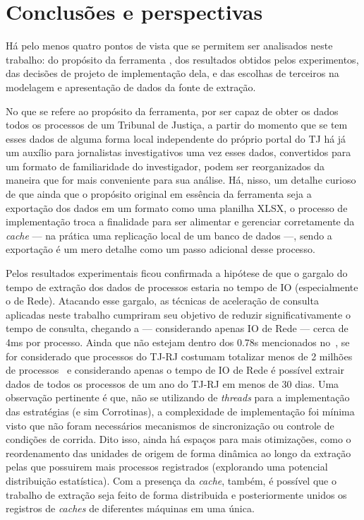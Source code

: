 \chapter{Conclusões e perspectivas~\label{chp:conclusions}}

Há pelo menos quatro pontos de vista que se permitem ser analisados neste
trabalho: do propósito da ferramenta \tjscraper, dos resultados obtidos pelos
experimentos, das decisões de projeto de implementação dela, e das escolhas de
terceiros na modelagem e apresentação de dados da fonte de extração.

No que se refere ao propósito da ferramenta, por ser capaz de obter os dados
todos os processos de um Tribunal de Justiça, a partir do momento que se tem
esses dados de alguma forma local independente do próprio portal do TJ há já um
auxílio para jornalistas investigativos uma vez esses dados, convertidos para
um formato de familiaridade do investigador, podem ser reorganizados da maneira
que for mais conveniente para sua análise. Há, nisso, um detalhe curioso de que
ainda que o propósito original em essência da ferramenta seja a exportação dos
dados em um formato como uma planilha XLSX, o processo de implementação troca a
finalidade para ser alimentar e gerenciar corretamente da \textit{cache} --- na
prática uma replicação local de um banco de dados ---, sendo a exportação é um
mero detalhe como um passo adicional desse processo.

Pelos resultados experimentais ficou confirmada a hipótese de que o gargalo do
tempo de extração dos dados de processos estaria no tempo de IO (especialmente
o de Rede). Atacando esse gargalo, as técnicas de aceleração de consulta
aplicadas neste trabalho cumpriram seu objetivo de reduzir significativamente o
tempo de consulta, chegando a --- considerando apenas IO de Rede --- cerca de
4ms por processo. Ainda que não estejam dentro dos 0.78s mencionados
no~, se for considerado que processos do
TJ-RJ costumam totalizar menos de 2 milhões de
processos~\cite{conjur:tj-novos-processos,amaerj:tj-novos-processos} e
considerando apenas o tempo de IO de Rede é possível extrair dados de todos os
processos de um ano do TJ-RJ em menos de 30 dias. Uma observação pertinente é
que, não se utilizando de \textit{threads} para a implementação das estratégias
(e sim Corrotinas), a complexidade de implementação foi mínima visto que não
foram necessários mecanismos de sincronização ou controle de condições de
corrida. Dito isso, ainda há espaços para mais otimizações, como o
reordenamento das unidades de origem de forma dinâmica ao longo da extração
pelas que possuirem mais processos registrados (explorando uma potencial
distribuição estatística). Com a presença da \textit{cache}, também, é possível
que o trabalho de extração seja feito de forma distribuida e posteriormente
unidos os registros de \textit{caches} de diferentes máquinas em uma única.

